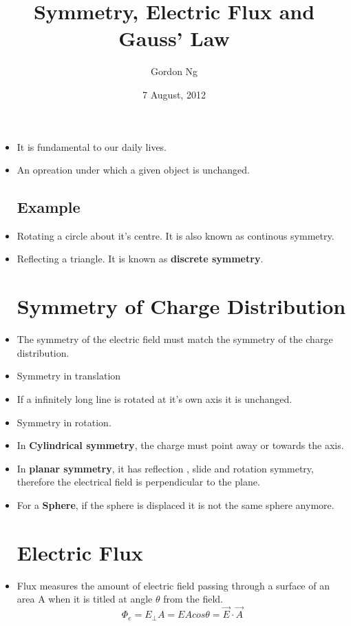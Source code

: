 \documentclass[12pt]{article}
\begin{document}
\title{Symmetry, Electric Flux and Gauss' Law}
\date{7 August, 2012}
\author{Gordon Ng}
\maketitle

\pagebreak
\tableofcontents
\pagebreak
\begin{itemize}
\section{Introduction to Symmetry}
\item It is fundamental to our daily lives.
\item An opreation under which a given object is unchanged.
\subsection{Example}
\item Rotating a circle about it's centre. It is also known as continous symmetry.
\item Reflecting a triangle. It is known as \textbf{discrete symmetry}. 
\section{Symmetry of Charge Distribution}
\item The symmetry of the electric field must match the symmetry of the charge distribution.
\item Symmetry in translation
\item If a infinitely long line is rotated at it's own axis it is unchanged.
\item Symmetry in rotation.
\item In \textbf{Cylindrical symmetry}, the charge must point away or towards the axis.
\item In \textbf{planar symmetry}, it has reflection , slide  and rotation symmetry, therefore the electrical field is perpendicular to the plane.
\item For a \textbf{Sphere}, if the sphere is displaced it is not the same sphere anymore.
\pagebreak
\section{Electric Flux}
\item Flux measures the amount of electric field passing through a surface of an area A when it is titled at angle $\theta$ from the field.
\begin{displaymath}
  \Phi_e = E_{\bot}A=EAcos \theta = \vec{E} \cdot  \vec{A}
\end{displaymath}

\end{itemize}
\end{document}
